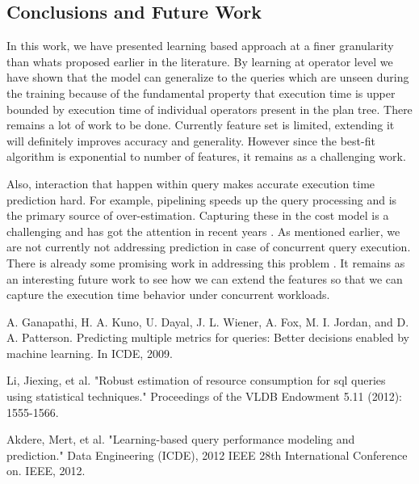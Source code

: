 \documentclass{article}
\begin{document}
\begin{multicols}{2}
	\section{Conclusions and Future Work}
	In this work, we have presented learning based approach at a finer granularity than whats proposed earlier in the literature. By learning at operator level we have shown that the model can generalize to the queries which are unseen during the training because of the fundamental property that execution time is upper bounded by execution time of individual operators present in the plan tree. 
	There remains a lot of work to be done. Currently feature set is limited, extending it will definitely improves accuracy and generality. However since the best-fit algorithm is exponential to number of features, it remains as a challenging work.
	
Also, interaction that happen within query makes accurate execution time prediction hard. For example, pipelining speeds up the query processing and is the primary source of over-estimation. Capturing these in the cost model is a challenging and has got the attention in recent years \cite{concurrent}. As mentioned earlier, we are not currently not addressing prediction in case of concurrent query execution. There is already some promising work in addressing this problem \cite{Ahmed,qshuffler}. It remains as an interesting future work to see how we can extend the features so that we can capture the execution time behavior under concurrent workloads.
	
	\begin{thebibliography}{9}
	A. Ganapathi, H. A. Kuno, U. Dayal, J. L. Wiener, A. Fox, M. I. Jordan,
	and D. A. Patterson. Predicting multiple metrics for queries: Better
	decisions enabled by machine learning. In ICDE, 2009.
	
	Li, Jiexing, et al. "Robust estimation of resource consumption for sql queries using statistical 			techniques." Proceedings of the VLDB Endowment 5.11 (2012): 1555-1566.
	
	Akdere, Mert, et al. "Learning-based query performance modeling and prediction." Data Engineering 			(ICDE), 2012 IEEE 28th International Conference on. IEEE, 2012.	
	

\end{thebibliography}
\end{multicols}
\end{document}
